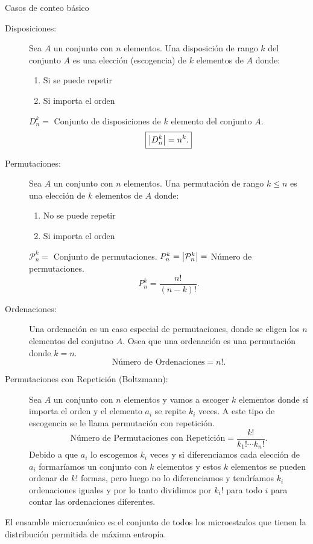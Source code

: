 Casos de conteo básico
\begin{description}
    \item[Disposiciones: ]  Sea $A$ un conjunto con $n$ elementos. Una disposición de rango $k$ del conjunto $A$ es una elección (escogencia) de $k$ elementos de $A$ donde:
    \begin{enumerate}
        \item Si se puede repetir
        \item Si importa el orden
    \end{enumerate}
    $D_n ^k = $ Conjunto de disposiciones de $k$ elemento del conjunto $A$.
        $$  \boxed{ \abs{D_n ^k} = n^k . } $$
    \item[Permutaciones: ] Sea $A$ un conjunto con $n$ elementos. Una permutación de rango $k\leq n$ es una elección de $k$ elementos de $A$ donde: 
    \begin{enumerate}
        \item No se puede repetir
        \item Si importa el orden
    \end{enumerate}
    $\mathcal{P}_n ^k = $ Conjunto de permutaciones. $P_n ^k = \abs{\mathcal{P}_n ^k} = $ Número de permutaciones.
        $$ \boxed{ P_n ^k = \frac{n!}{(n - k)!}. } $$
    \item[Ordenaciones: ] Una ordenación es un caso especial de permutaciones, donde se eligen los $n$ elementos del conjutno $A$. Osea que una ordenación es una permutación donde $k=n$.
        $$ \boxed{ \text{Número de Ordenaciones} = n!. } $$
    \item[Permutaciones con Repetición (Boltzmann): ] Sea $A$ un conjunto con $n$ elementos y vamos a escoger $k$ elementos donde sí importa el orden y el elemento $a_i$ se repite $k_i$ veces. A este tipo de escogencia se le llama permutación con repetición.
        $$ \boxed{ \text{Número de Permutaciones con Repetición} = \frac{k!}{k_1 ! \cdots k_n !}. } $$
    Debido a que $a_i$ lo escogemos $k_i$ veces y si diferenciamos cada elección de $a_i$ formaríamos un conjunto con $k$ elementos y estos $k$ elementos se pueden ordenar de $k!$ formas, pero luego no lo diferenciamos y tendríamos $k_i$ ordenaciones iguales y por lo tanto dividimos por $k_i!$ para todo $i$ para contar las ordenaciones diferentes.
\end{description}

\begin{tcolorbox}
El ensamble microcanónico es el conjunto de todos los microestados que tienen la distribución permitida de máxima entropía.
\end{tcolorbox}

